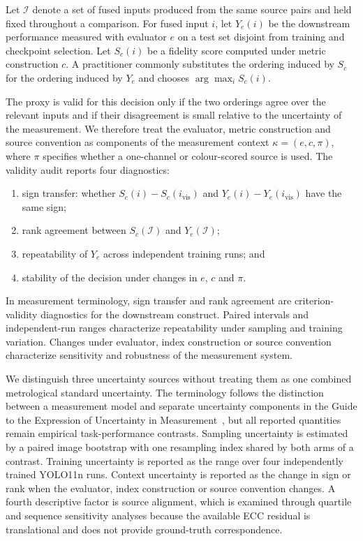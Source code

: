 \documentclass[journal]{IEEEtran}
\begin{document}
Let $\mathcal{I}$ denote a set of fused inputs produced from the same source pairs and
held fixed throughout a comparison. For fused input $i$, let
$Y_e(i)$ be the downstream performance measured with evaluator $e$ on a test set
disjoint from training and checkpoint selection. Let $S_c(i)$ be a fidelity score
computed under metric construction $c$. A practitioner commonly substitutes the
ordering induced by $S_c$ for the ordering induced by $Y_e$ and chooses $\arg\max_i
S_c(i)$.

The proxy is valid for this decision only if the two orderings agree over the relevant
inputs and if their disagreement is small relative to the uncertainty of the
measurement. We therefore treat the evaluator, metric construction and source
convention as components of the measurement context
$\kappa=(e,c,\pi)$, where $\pi$ specifies whether a one-channel or colour-scored source
is used. The validity audit reports four diagnostics:
\begin{enumerate}\setlength\itemsep{0pt}
\item sign transfer: whether $S_c(i)-S_c(i_{\mathrm{vis}})$ and
$Y_e(i)-Y_e(i_{\mathrm{vis}})$ have the same sign;
\item rank agreement between $S_c(\mathcal{I})$ and $Y_e(\mathcal{I})$;
\item repeatability of $Y_e$ across independent training runs; and
\item stability of the decision under changes in $e$, $c$ and $\pi$.
\end{enumerate}

In measurement terminology, sign transfer and rank agreement are criterion-validity
diagnostics for the downstream construct. Paired intervals and independent-run ranges
characterize repeatability under sampling and training variation. Changes under
evaluator, index construction or source convention characterize sensitivity and
robustness of the measurement system.

We distinguish three uncertainty sources without treating them as one combined
metrological standard uncertainty. The terminology follows the distinction between a
measurement model and separate uncertainty components in the Guide to the Expression of
Uncertainty in Measurement~\cite{jcgm100}, but all reported quantities remain empirical
task-performance contrasts. Sampling uncertainty is estimated by a paired image
bootstrap with one resampling index shared by both arms of a contrast. Training
uncertainty is reported as the range over four independently trained YOLO11n runs.
Context uncertainty is reported as the change in sign or rank when the evaluator,
index construction or source convention changes. A fourth descriptive factor is source
alignment, which is examined through quartile and sequence sensitivity analyses because
the available ECC residual is translational and does not provide ground-truth
correspondence.
\end{document}
